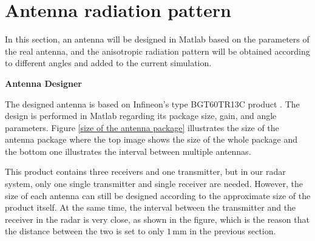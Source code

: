 \documentclass[12pt,DIV14,BCOR12mm,a4paper,footinclude=false,headinclude,parskip=half-,twoside,openright,cleardoublepage=empty,toc=index,bibliography=totoc,listof=totoc]{scrreprt}
\numberwithin{equation}{chapter}
\begin{document}
\section{Antenna radiation pattern} \label{Antenna radiation pattern}
In this section, an antenna will be designed in Matlab based on the parameters of the real antenna, and the anisotropic radiation pattern will be obtained according to different angles and added to the current simulation.

\begin{spacing}{1.5}
\textbf{\large{Antenna Designer}}
\end{spacing}

The designed antenna is based on Infineon's type BGT60TR13C product \cite{datasheet}. The design is performed in Matlab regarding its package size, gain, and angle parameters. Figure \ref{size of the antenna package} illustrates the size of the antenna package where the top image shows the size of the whole package and the bottom one illustrates the interval between multiple antennas.

This product contains three receivers and one transmitter, but in our radar system, only one single transmitter and single receiver are needed. However, the size of each antenna can still be designed according to the approximate size of the product itself. At the same time, the interval between the transmitter and the receiver in the radar is very close, as shown in the figure, which is the reason that the distance between the two is set to only $1\,\mathrm{mm}$ in the previous section.
\end{document}

